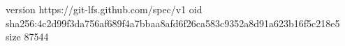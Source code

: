 version https://git-lfs.github.com/spec/v1
oid sha256:4c2d99f3da756af689f4a7bbaa8afd6f26ca583c9352a8d91a623b16f5c218e5
size 87544
